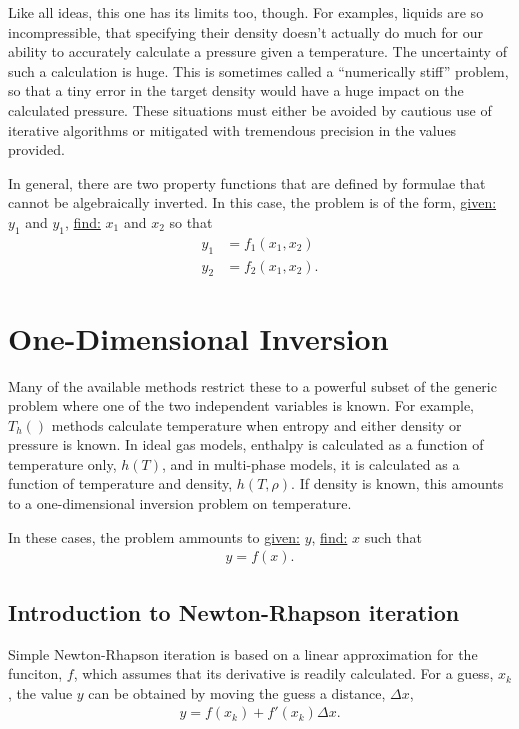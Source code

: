 \documentclass{article}
\begin{document}
Like all ideas, this one has its limits too, though.  For examples, liquids are so incompressible, that specifying their density doesn't actually do much for our ability to accurately calculate a pressure given a temperature.  The uncertainty of such a calculation is huge.  This is sometimes called a ``numerically stiff'' problem, so that a tiny error in the target density would have a huge impact on the calculated pressure.  These situations must either be avoided by cautious use of iterative algorithms or mitigated with tremendous precision in the values provided.  

In general, there are two property functions that are defined by formulae that cannot be algebraically inverted.  In this case, the problem is of the form, \underline{given:} $y_1$ and $y_1$, \underline{find:} $x_1$ and $x_2$ so that
\begin{align}
y_1 &= f_1(x_1, x_2)\\
y_2 &= f_2(x_1, x_2).
\end{align}


\section{One-Dimensional Inversion}

Many of the available methods restrict these to a powerful subset of the generic problem where one of the two independent variables is known.  For example, $T_h()$ methods calculate temperature when entropy and either density or pressure is known.  In ideal gas models, enthalpy is calculated as a function of temperature only, $h(T)$, and in multi-phase models, it is calculated as a function of temperature and density, $h(T,\rho)$.  If density is known, this amounts to a one-dimensional inversion problem on temperature.

In these cases, the problem ammounts to \underline{given:} $y$, \underline{find:} $x$ such that
\begin{align}
y = f(x).
\end{align}

\subsection{Introduction to Newton-Rhapson iteration}

Simple Newton-Rhapson iteration is based on a linear approximation for the funciton, $f$, which assumes that its derivative is readily calculated.  For a guess, $x_k$, the value $y$ can be obtained by moving the guess a distance, $\Delta x$,
\begin{align}
y = f(x_k) + f'(x_k) \Delta x.
\end{align}
\end{document}
